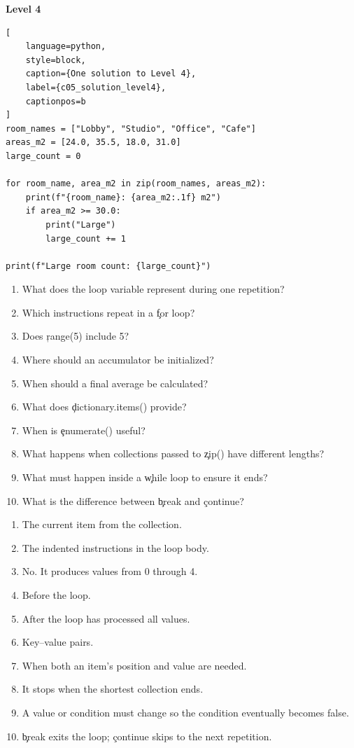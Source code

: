 \textbf{Level 4}

\begin{lstlisting}[
    language=python,
    style=block,
    caption={One solution to Level 4},
    label={c05_solution_level4},
    captionpos=b
]
room_names = ["Lobby", "Studio", "Office", "Cafe"]
areas_m2 = [24.0, 35.5, 18.0, 31.0]
large_count = 0

for room_name, area_m2 in zip(room_names, areas_m2):
    print(f"{room_name}: {area_m2:.1f} m2")
    if area_m2 >= 30.0:
        print("Large")
        large_count += 1

print(f"Large room count: {large_count}")
\end{lstlisting}


\begin{enumerate}
    \item What does the loop variable represent during one repetition?
    \item Which instructions repeat in a \c{for} loop?
    \item Does \c{range(5)} include 5?
    \item Where should an accumulator be initialized?
    \item When should a final average be calculated?
    \item What does \c{dictionary.items()} provide?
    \item When is \c{enumerate()} useful?
    \item What happens when collections passed to \c{zip()} have different lengths?
    \item What must happen inside a \c{while} loop to ensure it ends?
    \item What is the difference between \c{break} and \c{continue}?
\end{enumerate}


\begin{enumerate}
    \item The current item from the collection.
    \item The indented instructions in the loop body.
    \item No. It produces values from 0 through 4.
    \item Before the loop.
    \item After the loop has processed all values.
    \item Key--value pairs.
    \item When both an item's position and value are needed.
    \item It stops when the shortest collection ends.
    \item A value or condition must change so the condition eventually becomes false.
    \item \c{break} exits the loop; \c{continue} skips to the next repetition.
\end{enumerate}

